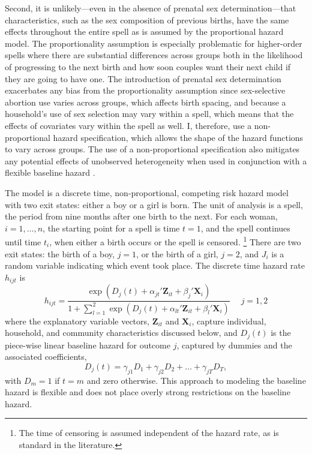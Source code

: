 \documentclass[12pt,letterpaper]{article}
\begin{document}
Second, it is unlikely---even in the absence of prenatal sex determination---that 
characteristics, such as the sex composition of previous births, have the same effects 
throughout the entire spell as is assumed by the proportional hazard model.
The proportionality assumption is especially problematic for higher-order spells where 
there are substantial differences across groups both in the likelihood of progressing to 
the next birth and how soon couples want their next child if they are going to have one.
The introduction of prenatal sex determination exacerbates any bias from the 
proportionality assumption since sex-selective abortion use varies across groups,
which affects birth spacing, and because a household's use of sex selection may vary 
within a spell, which means that the effects of covariates vary within the spell as well.
I, therefore, use a non-proportional hazard specification, which allows the shape of the 
hazard functions to vary across groups.
The use of a non-proportional specification also mitigates any potential effects 
of unobserved heterogeneity when used in conjunction with a flexible baseline hazard 
\citep{Dolton1995}.

The model is a discrete time, non-proportional, competing risk hazard model with two exit 
states: either a boy or a girl is born.
The unit of analysis is a spell, the period from nine months after one birth to the next.
For each woman, $i=1,\ldots,n$, the starting point for a spell is time $t=1$, and 
the spell continues until time $t_i$, when either a birth occurs or the spell 
is censored.%
\footnote{
The time of censoring is assumed independent of the hazard rate,
as is standard in the literature.
}
There are two exit states: the birth of a boy, $j=1$, or the birth of a girl, $j=2$, and 
$J_i$ is a random variable indicating which event took place.
The discrete time hazard rate $h_{ijt}$ is 
\begin{equation}
 h_{ijt} = \frac{\exp(D_j(t) + \alpha_{jt}'\mathbf{Z}_{it} + \beta_j'\mathbf{X}_{i})} 
 {1 + \sum_{l=1}^2 \exp(D_j(t) + \alpha_{lt}'\mathbf{Z}_{it} + \beta_l'\mathbf{X}_{i})} \: \: \; \; \;  j = 1,2
 \label{eq:hazard}
\end{equation}
where the explanatory variable vectors, $\mathbf{Z}_{it}$ and $\mathbf{X}_{i}$, capture 
individual, household, and community characteristics discussed below,
and $D_{j}(t)$ is the piece-wise linear baseline hazard for outcome $j$, captured
by dummies and the associated coefficients,
\begin{equation}
D_j(t) = \gamma_{j1} D_1 + \gamma_{j2} D_2 + \ldots + \gamma_{jT} D_T,
\end{equation}
with $D_m = 1$ if $t=m$ and zero otherwise.
This approach to modeling the baseline hazard is flexible and does not place 
overly strong restrictions on the baseline hazard.
\end{document}
